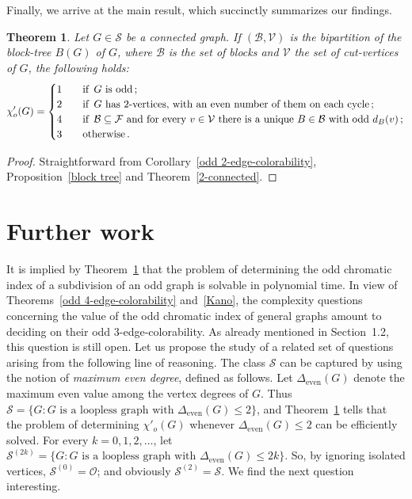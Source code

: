 \documentclass[a4paper,12pt]{article}
\newtheorem{theorem}{Theorem}[section]
\numberwithin{equation}{section}
\begin{document}

\bigskip

  Finally, we arrive at the main result, which succinctly summarizes our findings.



\begin{theorem}
    \label{thm}
Let $G\in \mathcal{S}$ be a connected graph. If $(\mathcal{B},\mathcal{V})$ is the bipartition of the block-tree $B(G)$ of $G$, where $\mathcal{B}$ is the set of blocks and $\mathcal{V}$ the set of cut-vertices of $G$, the following holds:
\begin{equation*}
\chi'_o(G)=
\begin{cases}
1 & \text{\quad if \,} G \text{ is odd} \,;\\
2 & \text{\quad if \,} G \text{ has 2-vertices, with an even number of them on each cycle}\,;\\
4 & \text{\quad if \,} \mathcal{B}\subseteq\mathcal{F} \text{ and for every }  v\in\mathcal{V} \text{ there is a unique } B\in\mathcal{B} \text{ with odd } d_B(v)\,;\\
3 & \text{\quad otherwise}\,.
\end{cases}
\end{equation*}
\end{theorem}
\begin{proof}
Straightforward from Corollary~\ref{odd 2-edge-colorability}, Proposition~\ref{block tree} and Theorem~\ref{2-connected}.
\end{proof}

\section{Further work}

It is implied by Theorem~\ref{thm} that the problem of determining the odd chromatic index of a subdivision of an odd graph is solvable in polynomial time. In view of Theorems~\ref{odd 4-edge-colorability} and~\ref{Kano}, the complexity questions concerning the value of the odd chromatic index of general graphs amount to deciding on their odd $3$-edge-colorability. As already mentioned in Section~1.2, this question is still open.
Let us propose the study of a related set of questions arising from the following line of reasoning. The class $\mathcal{S}$ can be captured by using the notion of \textit{maximum even degree}, defined as follows. Let $\Delta_{\mathrm{even}}(G)$ denote the maximum even value among the vertex degrees of $G$. Thus $\mathcal{S}=\{G: G \text{ is a loopless graph with }\Delta_{\mathrm{even}}(G)\leq2\}$, and Theorem~\ref{thm} tells that the problem of determining $\chi'_o(G)$ whenever $\Delta_{\mathrm{even}}(G)\leq2$ can be efficiently solved. For every $k=0,1,2,\ldots$, let  $\mathcal{S}^{(2k)}=\{G: G \text{ is a loopless graph with }\Delta_{\mathrm{even}}(G)\leq2k\}$. So, by ignoring isolated vertices, $\mathcal{S}^{(0)}=\mathcal{O}$; and obviously  $\mathcal{S}^{(2)}=\mathcal{S}$. We find the next question interesting.
\end{document}
